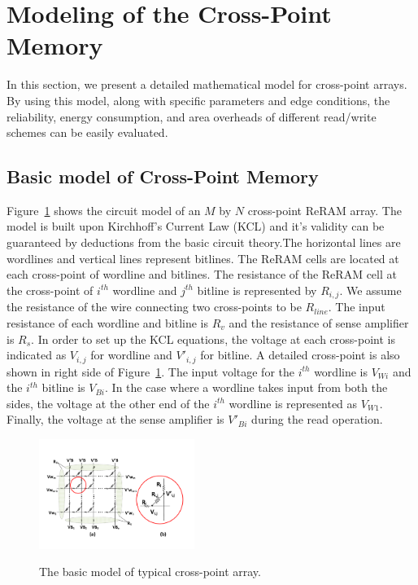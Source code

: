 \vspace{10pt}
\section{Modeling of the Cross-Point Memory}\label{sec:model}

In this section, we present a detailed mathematical model for cross-point arrays. By using this model, along with specific parameters and
edge conditions, the reliability, energy consumption, and area overheads of different read/write schemes can be easily evaluated.

\subsection{Basic model of Cross-Point Memory}
Figure~\ref{fig:modeling} shows the circuit model of an $M$ by $N$ cross-point ReRAM array. The model is built upon Kirchhoff's Current Law (KCL) and it's validity can be guaranteed by deductions from the basic circuit theory.The horizontal lines are wordlines and vertical lines represent bitlines. The ReRAM cells are located at each cross-point of wordline and bitlines. The resistance of the ReRAM cell at the cross-point of $i^{th}$ wordline and $j^{th}$ bitline is represented by $R_{i,j}$. We assume the resistance of the wire connecting two cross-points to be $R_{line}$. The input resistance of each wordline and bitline is $R_v$ and the resistance of sense amplifier is $R_s$. In order to set up the KCL equations, the voltage at each cross-point is indicated as $V_{i,j}$ for wordline and $V'_{i,j}$ for bitline. A detailed cross-point is also shown in right side of Figure~\ref{fig:modeling}. The input voltage for the $i^{th}$ wordline is $V_{Wi}$ and the $i^{th}$ bitline is $V_{Bi}$. In the case where a wordline takes input from both the sides, the voltage at the other end of the $i^{th}$ wordline is represented as $V_{W1}$. Finally, the voltage at the sense amplifier is $V'_{Bi}$ during the read operation.


\begin{figure}%
\centering
  \includegraphics[width=0.45\textwidth]{./figures/model_f.pdf}\\
  \caption{The basic model of typical cross-point array.}\label{fig:modeling}
  \vspace{-12pt}
\end{figure}

